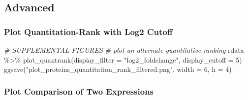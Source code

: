 \documentclass[
]{book}
\newenvironment{Shaded}{\begin{snugshade}}{\end{snugshade}}
\newcommand{\AttributeTok}[1]{\textcolor[rgb]{0.77,0.63,0.00}{#1}}
\newcommand{\CommentTok}[1]{\textcolor[rgb]{0.56,0.35,0.01}{\textit{#1}}}
\newcommand{\DecValTok}[1]{\textcolor[rgb]{0.00,0.00,0.81}{#1}}
\newcommand{\FunctionTok}[1]{\textcolor[rgb]{0.00,0.00,0.00}{#1}}
\newcommand{\NormalTok}[1]{#1}
\newcommand{\SpecialCharTok}[1]{\textcolor[rgb]{0.00,0.00,0.00}{#1}}
\newcommand{\StringTok}[1]{\textcolor[rgb]{0.31,0.60,0.02}{#1}}
\begin{document}
\hypertarget{advanced}{%
\subsection{Advanced}\label{advanced}}

\hypertarget{plot-quantitation-rank-with-log2-cutoff}{%
\subsubsection{Plot Quantitation-Rank with Log2 Cutoff}\label{plot-quantitation-rank-with-log2-cutoff}}

\begin{Shaded}
\begin{Highlighting}[]
\CommentTok{\# SUPPLEMENTAL FIGURES}
\CommentTok{\# plot an alternate quantitative ranking}
\NormalTok{rdata }\SpecialCharTok{\%\textgreater{}\%}
  \FunctionTok{plot\_quantrank}\NormalTok{(}\AttributeTok{display\_filter =} \StringTok{"log2\_foldchange"}\NormalTok{,}
                 \AttributeTok{display\_cutoff =} \DecValTok{5}\NormalTok{)}
\FunctionTok{ggsave}\NormalTok{(}\StringTok{"plot\_proteins\_quantitation\_rank\_filtered.png"}\NormalTok{,}
       \AttributeTok{width =} \DecValTok{6}\NormalTok{, }\AttributeTok{h =} \DecValTok{4}\NormalTok{)}
\end{Highlighting}
\end{Shaded}

\hypertarget{plot-comparison-of-two-expressions}{%
\subsubsection{Plot Comparison of Two Expressions}\label{plot-comparison-of-two-expressions}}
\end{document}
